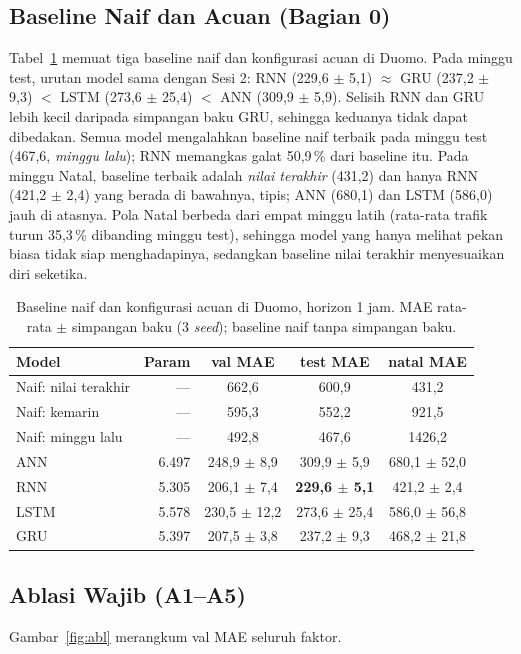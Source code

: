 \documentclass[conference,a4paper]{IEEEtran}
\begin{document}
\subsection{Baseline Naif dan Acuan (Bagian 0)}
Tabel~\ref{tab:base} memuat tiga baseline naif dan konfigurasi acuan di Duomo. Pada minggu test, urutan model sama dengan Sesi 2: RNN (229,6 $\pm$ 5,1) $\approx$ GRU (237,2 $\pm$ 9,3) $<$ LSTM (273,6 $\pm$ 25,4) $<$ ANN (309,9 $\pm$ 5,9). Selisih RNN dan GRU lebih kecil daripada simpangan baku GRU, sehingga keduanya tidak dapat dibedakan. Semua model mengalahkan baseline naif terbaik pada minggu test (467,6, \emph{minggu lalu}); RNN memangkas galat 50,9\,\% dari baseline itu. Pada minggu Natal, baseline terbaik adalah \emph{nilai terakhir} (431,2) dan hanya RNN (421,2 $\pm$ 2,4) yang berada di bawahnya, tipis; ANN (680,1) dan LSTM (586,0) jauh di atasnya. Pola Natal berbeda dari empat minggu latih (rata-rata trafik turun 35,3\,\% dibanding minggu test), sehingga model yang hanya melihat pekan biasa tidak siap menghadapinya, sedangkan baseline nilai terakhir menyesuaikan diri seketika.

\begin{table}[t]
  \centering
  \caption{Baseline naif dan konfigurasi acuan di Duomo, horizon 1 jam. MAE rata-rata $\pm$ simpangan baku (3 \textit{seed}); baseline naif tanpa simpangan baku.}
  \label{tab:base}
  \footnotesize
  \setlength{\tabcolsep}{3pt}
  \begin{tabular}{@{}lrccc@{}}
    \toprule
    Model & Param & val MAE & test MAE & natal MAE \\
    \midrule
    Naif: nilai terakhir & --- & 662,6 & 600,9 & 431,2 \\
    Naif: kemarin & --- & 595,3 & 552,2 & 921,5 \\
    Naif: minggu lalu & --- & 492,8 & 467,6 & 1426,2 \\
    \midrule
    ANN & 6.497 & 248,9 $\pm$ 8,9 & 309,9 $\pm$ 5,9 & 680,1 $\pm$ 52,0 \\
    RNN & 5.305 & 206,1 $\pm$ 7,4 & \textbf{229,6 $\pm$ 5,1} & 421,2 $\pm$ 2,4 \\
    LSTM & 5.578 & 230,5 $\pm$ 12,2 & 273,6 $\pm$ 25,4 & 586,0 $\pm$ 56,8 \\
    GRU & 5.397 & 207,5 $\pm$ 3,8 & 237,2 $\pm$ 9,3 & 468,2 $\pm$ 21,8 \\
    \bottomrule
  \end{tabular}
\end{table}

\subsection{Ablasi Wajib (A1--A5)}
Gambar~\ref{fig:abl} merangkum val MAE seluruh faktor.
\end{document}
